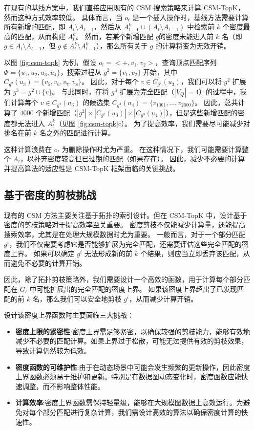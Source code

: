 在现有的基线方案中，我们直接应用现有的 CSM 搜索策略来计算 CSM-TopK，然而这种方式效率较低。
具体而言，当 $o_t$ 是一个插入操作时，基线方法需要计算所有新增的匹配，即 $A_{t} \setminus A_{t-1}$，然后从 $A_{t-1}^k \cup (A_{t} \setminus A_{t-1})$ 中检索前 $k$ 个密度最高的匹配，从而构建 $A_t^k$。
然而，若某个新增匹配 $g$的密度未能进入前 $k$ 名（即 $g \in A_{t} \setminus A_{t-1}$，但 $g \notin A_{t}^k \setminus A_{t-1}^k$），那么所有关于 $g$ 的计算将变为无效开销。

以图 \ref{fig:csm-topk} 为例，假设 $o_t = <+, v_1, v_2>$，查询顶点匹配序列 $\Phi = \{u_1, u_2, u_3, u_4\}$，搜索过程从 $g^2 = \{v_1, v_2\}$ 开始，其中 $C_{g^{2}}(u_{3}) = \{v_5, v_6, v_7, v_8\}$。
因此，对于每个 $v \in C_{g^{2}}(u_{3})$，我们可以将 $g^2$ 扩展为 $g^3 = g^2 \cup \{v\}$。
与此同时，在将 $g^3$ 扩展为完全匹配（$|V_Q| = 4$）的过程中，我们计算每个 $v \in C_{g^{2}}(u_{3})$ 的候选集 $C_{g^{3}}(u_{4}) = \{v_{1001}, \dots, v_{2000}\}$。
因此，总共计算了 $4000$ 个新增匹配（$|g^2| \times |C_{g^{2}}(u_{3})| \times |C_{g^{3}}(u_{4})|$），但是这些新增匹配的密度都无法进入 $A^k_t$（见图 \ref{fig:csm-topk}c）。
为了提高效率，我们需要尽可能减少对排名在前 $k$ 名之外的匹配进行计算。


这种计算浪费在 $o_t$ 为删除操作时尤为严重。
在这种情况下，我们可能需要计算整个 $A_{t}$，以补充密度较高但已过期的匹配（如果存在）。
因此，减少不必要的计算并提高算法的适应性是 CSM-TopK 框架面临的关键挑战。


\subsection{基于密度的剪枝挑战}

现有的 CSM 方法主要关注基于拓扑的索引设计。但在 CSM-TopK 中，设计基于密度的剪枝策略对于提高效率至关重要。
密度剪枝不仅能减少计算量，还能提高搜索效率，尤其是在处理大规模数据时尤为重要。
一般而言，对于一个部分匹配 $g^i$，我们不仅需要考虑它是否能够扩展为完全匹配，还需要评估这些完全匹配的密度上界。
如果可以确定 $g^i$ 无法形成新的前 $k$ 个结果，则应当立即丢弃该匹配，从而避免不必要的计算开销。

因此，除了拓扑剪枝策略外，我们需要设计一个高效的函数，用于计算每个部分匹配在 $G_t$ 中可能扩展出的完全匹配的密度上界。
如果该密度上界超出了已发现匹配的前 $k$ 名，那么我们可以安全地剪枝 $g^i$，从而减少计算开销。

设计该密度上界函数时主要面临三大挑战：

\begin{itemize}
    \item \textbf{密度上限的紧密性}:密度上界需足够紧密，以确保较强的剪枝能力，能够有效地减少不必要的匹配计算。如果上界过于松散，可能无法提供有效的剪枝效果，导致计算仍然较为低效。
    \item \textbf{密度函数的可维护性}:由于在动态场景中可能会发生频繁的更新操作，因此密度上界函数必须易于维护和更新。特别是在数据图动态变化时，密度函数应能快速调整，而不影响整体性能。
    \item \textbf{计算效率}:密度上界函数需保持轻量级，能够在大规模图数据上高效运行。为避免对每个部分匹配进行复杂计算，我们需设计高效的算法以确保密度计算的快速性。
\end{itemize}   

